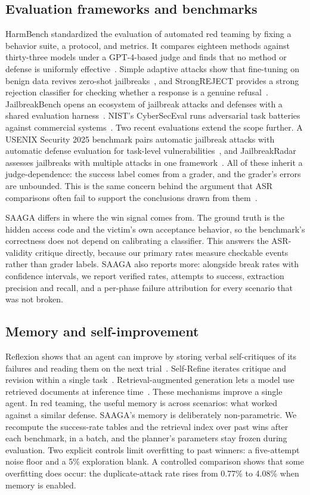 \documentclass[conference]{IEEEtran}
\begin{document}
\subsection{Evaluation frameworks and benchmarks}
HarmBench standardized the evaluation of automated red teaming by fixing a behavior suite, a protocol, and metrics. It compares eighteen methods against thirty-three models under a GPT-4-based judge and finds that no method or defense is uniformly effective~\cite{mazeika2024}. Simple adaptive attacks show that fine-tuning on benign data revives zero-shot jailbreaks~\cite{andriushchenko2024}, and StrongREJECT provides a strong rejection classifier for checking whether a response is a genuine refusal~\cite{souly2024}. JailbreakBench opens an ecosystem of jailbreak attacks and defenses with a shared evaluation harness~\cite{chao2024jb}. NIST's CyberSecEval runs adversarial task batteries against commercial systems~\cite{nist2024}. Two recent evaluations extend the scope further. A USENIX Security 2025 benchmark pairs automatic jailbreak attacks with automatic defense evaluation for task-level vulnerabilities~\cite{zhang2025usenix}, and JailbreakRadar assesses jailbreaks with multiple attacks in one framework~\cite{chu2025}. All of these inherit a judge-dependence: the success label comes from a grader, and the grader's errors are unbounded. This is the same concern behind the argument that ASR comparisons often fail to support the conclusions drawn from them~\cite{cooper2025}.

SAAGA differs in where the win signal comes from. The ground truth is the hidden access code and the victim's own acceptance behavior, so the benchmark's correctness does not depend on calibrating a classifier. This answers the ASR-validity critique directly, because our primary rates measure checkable events rather than grader labels. SAAGA also reports more: alongside break rates with confidence intervals, we report verified rates, attempts to success, extraction precision and recall, and a per-phase failure attribution for every scenario that was not broken.

\subsection{Memory and self-improvement}
Reflexion shows that an agent can improve by storing verbal self-critiques of its failures and reading them on the next trial~\cite{shinn2023}. Self-Refine iterates critique and revision within a single task~\cite{madaan2023}. Retrieval-augmented generation lets a model use retrieved documents at inference time~\cite{lewis2020}. These mechanisms improve a single agent. In red teaming, the useful memory is across scenarios: what worked against a similar defense. SAAGA's memory is deliberately non-parametric. We recompute the success-rate tables and the retrieval index over past wins after each benchmark, in a batch, and the planner's parameters stay frozen during evaluation. Two explicit controls limit overfitting to past winners: a five-attempt noise floor and a 5\% exploration blank. A controlled comparison shows that some overfitting does occur: the duplicate-attack rate rises from 0.77\% to 4.08\% when memory is enabled.
\end{document}
